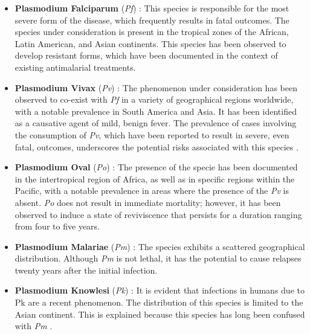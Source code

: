 \begin{tcolorbox}
	\begin{itemize}
		\item \textbf{\textcolor{codered!80}{Plasmodium Falciparum}} (\emph{Pf}) : This species is responsible for the most severe form of the disease, which frequently results in fatal outcomes. The species under consideration is present in the tropical zones of the African, Latin American, and Asian continents. This species has been observed to develop resistant forms, which have been documented in the context of existing antimalarial treatments.
		\item \textbf{\textcolor{codeblue!70}{Plasmodium Vivax}} (\emph{Pv}) : The phenomenon under consideration has been observed to co-exist with \emph{Pf} in a variety of geographical regions worldwide, with a notable prevalence in South America and Asia. It has been identified as a causative agent of mild, benign fever. The prevalence of cases involving the consumption of \emph{Pv}, which have been reported to result in severe, even fatal, outcomes, underscores the potential risks associated with this species \cite{Getachew2015,Barnadas2015,Marfurt2008}. 
		
		\item \textbf{\textcolor{codebrown!60}{Plasmodium Oval}} (\emph{Po}) : The presence of the specie has been documented in the intertropical region of Africa, as well as in specific regions within the Pacific, with a notable prevalence in areas where the presence of the \emph{Pv} is absent. \emph{Po} does not result in immediate mortality; however, it has been observed to induce a state of reviviscence that persists for a duration ranging from four to five years.
		
		\item \textbf{\textcolor{codegreen!65}{Plasmodium Malariae}} (\emph{Pm}) :  The species exhibits a scattered geographical distribution. Although \emph{Pm} is not lethal, it has the potential to cause relapses twenty years after the initial infection.
		
		\item \textbf{\textcolor{codepurple!70}{Plasmodium Knowlesi}} (\emph{Pk}) : It is evident that infections in humans due to Pk are a recent phenomenon. The distribution of this species is limited to the Asian continent. This is explained because this species has long been confused with \emph{Pm} \cite{CoxSingh2008,Singh2004}.
	\end{itemize}
\end{tcolorbox}	

